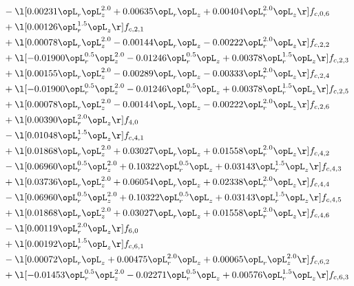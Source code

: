 \begin{alignat}{2}
& - \l[  0.00231 \opL_r \opL_z^{2.0} +  0.00635 \opL_r \opL_z +  0.00404 \opL_r^{2.0} \opL_z  \r] f_{c,0,6} \nonumber \\ 
& + \l[  0.00126 \opL_r^{1.5} \opL_z  \r] f_{c,2,1} \nonumber \\ 
& + \l[  0.00078 \opL_r \opL_z^{2.0}   -0.00144 \opL_r \opL_z   -0.00222 \opL_r^{2.0} \opL_z  \r] f_{c,2,2} \nonumber \\ 
& + \l[  -0.01900 \opL_r^{0.5} \opL_z^{2.0}   -0.01246 \opL_r^{0.5} \opL_z +  0.00378 \opL_r^{1.5} \opL_z  \r] f_{c,2,3} \nonumber \\ 
& + \l[  0.00155 \opL_r \opL_z^{2.0}   -0.00289 \opL_r \opL_z   -0.00333 \opL_r^{2.0} \opL_z  \r] f_{c,2,4} \nonumber \\ 
& + \l[  -0.01900 \opL_r^{0.5} \opL_z^{2.0}   -0.01246 \opL_r^{0.5} \opL_z +  0.00378 \opL_r^{1.5} \opL_z  \r] f_{c,2,5} \nonumber \\ 
& + \l[  0.00078 \opL_r \opL_z^{2.0}   -0.00144 \opL_r \opL_z   -0.00222 \opL_r^{2.0} \opL_z  \r] f_{c,2,6} \nonumber \\ 
& + \l[  0.00390 \opL_r^{2.0} \opL_z  \r] f_{4,0} \nonumber \\ 
& - \l[  0.01048 \opL_r^{1.5} \opL_z  \r] f_{c,4,1} \nonumber \\ 
& + \l[  0.01868 \opL_r \opL_z^{2.0} +  0.03027 \opL_r \opL_z +  0.01558 \opL_r^{2.0} \opL_z  \r] f_{c,4,2} \nonumber \\ 
& - \l[  0.06960 \opL_r^{0.5} \opL_z^{2.0} +  0.10322 \opL_r^{0.5} \opL_z +  0.03143 \opL_r^{1.5} \opL_z  \r] f_{c,4,3} \nonumber \\ 
& + \l[  0.03736 \opL_r \opL_z^{2.0} +  0.06054 \opL_r \opL_z +  0.02338 \opL_r^{2.0} \opL_z  \r] f_{c,4,4} \nonumber \\ 
& - \l[  0.06960 \opL_r^{0.5} \opL_z^{2.0} +  0.10322 \opL_r^{0.5} \opL_z +  0.03143 \opL_r^{1.5} \opL_z  \r] f_{c,4,5} \nonumber \\ 
& + \l[  0.01868 \opL_r \opL_z^{2.0} +  0.03027 \opL_r \opL_z +  0.01558 \opL_r^{2.0} \opL_z  \r] f_{c,4,6} \nonumber \\ 
& - \l[  0.00119 \opL_r^{2.0} \opL_z  \r] f_{6,0} \nonumber \\ 
& + \l[  0.00192 \opL_r^{1.5} \opL_z  \r] f_{c,6,1} \nonumber \\ 
& - \l[  0.00072 \opL_r \opL_z +  0.00475 \opL_r^{2.0} \opL_z +  0.00065 \opL_r \opL_z^{2.0}  \r] f_{c,6,2} \nonumber \\ 
& + \l[  -0.01453 \opL_r^{0.5} \opL_z^{2.0}   -0.02271 \opL_r^{0.5} \opL_z +  0.00576 \opL_r^{1.5} \opL_z  \r] f_{c,6,3} \nonumber \\ 

\end{alignat}

